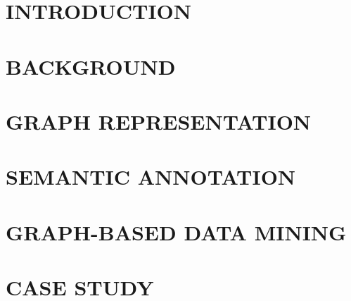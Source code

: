 \documentclass[dissertation,copyright,committeedraft,numbers,sort&compress,gsmodern]{uothesis}
\author{Haishan Liu}
\theoremstyle{definition}
\theoremstyle{definition}
\begin{document}
\maketitle

\chapter{INTRODUCTION}
\label{chap:introduction}



\chapter{BACKGROUND}
\label{chap:background}



\chapter{GRAPH REPRESENTATION}
\label{chap:representation}



\chapter{SEMANTIC ANNOTATION}
\label{chap:annotation}



\chapter{GRAPH-BASED DATA MINING}
\label{chap:datamining}



%


\chapter{CASE STUDY}
\label{chap:casestudy}

\end{document}

